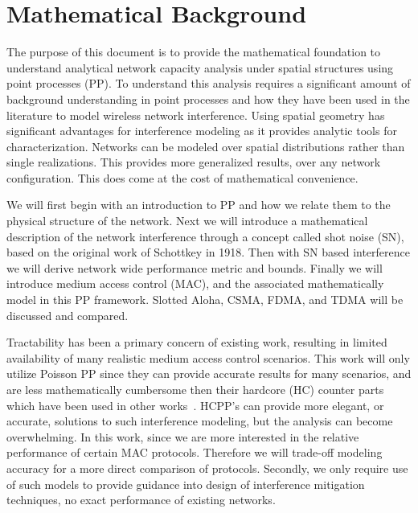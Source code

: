 \section{Mathematical Background}
The purpose of this document is to provide the mathematical foundation to understand analytical network capacity analysis under spatial structures using point processes (PP).  To understand this analysis requires a significant amount of background understanding in point processes and how they have been used in the literature to model wireless network interference.  Using spatial geometry has significant advantages for interference modeling as it provides analytic tools for characterization.  Networks can be modeled over spatial distributions rather than single realizations.  This provides more generalized results, over any network configuration.  This does come at the cost of mathematical convenience.\par
%

We will first begin with an introduction to PP and how we relate them to the physical structure of the network.  Next we will introduce a mathematical description of the network interference through a concept called shot noise (SN), based on the original work of Schottkey in 1918.  %
Then with SN based interference we will derive network wide performance metric and bounds.  Finally we will introduce medium access control (MAC), and the associated mathematically model in this PP framework. Slotted Aloha, CSMA, FDMA, and TDMA will be discussed and compared.
\par
%
Tractability has been a primary concern of existing work, resulting in limited availability of many realistic medium access control scenarios. This work will only utilize Poisson PP since they can provide accurate results for many scenarios, and are less mathematically cumbersome then their hardcore (HC) counter parts which have been used in other works~\cite{baccelli2009stochasticVII,Nguyen2007}. HCPP's can provide more elegant, or accurate, solutions to such interference modeling, but the analysis can become overwhelming.  In this work, since we are more interested in the relative performance of certain MAC protocols.  Therefore we will trade-off modeling accuracy for a more direct comparison of protocols.  Secondly, we only require use of such models to provide guidance into design of interference mitigation techniques, no exact performance of existing networks.\par
%
%
